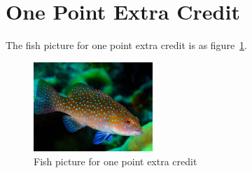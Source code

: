 \documentclass{article}
\theoremstyle{remark}
\theoremstyle{definition}
\begin{document}
    \section{One Point Extra Credit}
    The fish picture for one point extra credit is as figure~\ref{fig:fish}.
    \begin{figure}[!htbp]
        \centering
        \includegraphics[width=0.4\textwidth]{img/fish.jpg}
        \caption{Fish picture for one point extra credit}
        \label{fig:fish}
    \end{figure}
\end{document}
